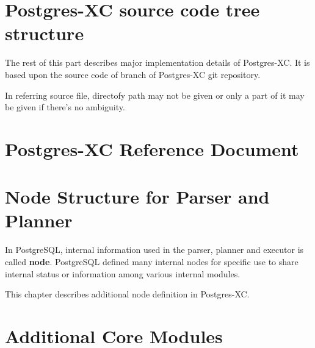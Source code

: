 \documentclass[10pt,a4paper]{book}
\newcommand{\file}{\begingroup%
	  \def\UrlBreaks{\do\\\do\/\do\_\do\-\do\+\do\=}%
		    \Url}
\newcommand{\XC}{Postgres-XC}
\newcommand{\PG}{PostgreSQL}
\begin{document}


\chapter{\label{chap:sourceTree}\XC{} source code tree structure}

  The rest of this part describes major implementation details of \XC.
  It is based upon the source code of \file{REL1_2_STABLE} branch of \XC{} git repository.
  
  In referring source file, directofy path may not be given or only a part of it may be
  given if there's no ambiguity.





\chapter{\label{chap:documentation}\XC{} Reference Document}





\chapter{\label{chap:internalnodes}Node Structure for Parser and Planner}

  In \PG, internal information used in the parser, planner and executor is called \textbf{node}.
  \PG{} defined many internal nodes for specific use to share internal status or information among
  various internal modules.  
  
  This chapter describes additional node definition in \XC.





\chapter{\label{chap:additionalCoreModules}Additional Core Modules}
\end{document}
